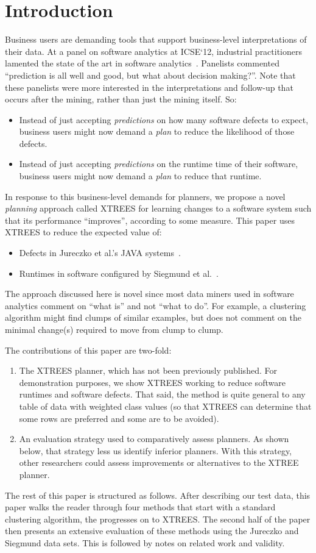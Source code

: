 \documentclass{sig-alternate}
\newcommand{\bi}{\begin{itemize}}
\newcommand{\ei}{\end{itemize}}
\newcommand{\be}{\begin{enumerate}}
\newcommand{\ee}{\end{enumerate}}
\begin{document}
\section{Introduction}
Business users are demanding  tools that support    business-level interpretations of their data. At a panel on software analytics at ICSE`12, industrial practitioners lamented the state of the art in software analytics~\cite{menzies12a}. Panelists commented  ``prediction is all well and good, but what about decision making?''. Note that these panelists were more interested in the interpretations and follow-up that occurs after the mining, rather than just the mining itself. So:
\bi
\item
Instead of just accepting {\em predictions} on how many software defects to expect, business users might now demand a {\em plan} to reduce the likelihood of those defects.
\item
Instead of just accepting {\em predictions} on the runtime time of their software, business users might now demand a {\em plan} to reduce that runtime. 
\ei
In response to this business-level demands for planners,
we propose a novel {\em planning} approach called XTREES for learning changes to a software system
such that its performance ``improves'', according to some measure. This paper uses XTREES
to reduce  the expected value of:
\bi
\item  Defects     in Jureczko et al.'s    JAVA systems~\cite{jureczko10}.
\item Runtimes   in   software    configured by  Siegmund et al.~\cite{sven12}.
\ei 
The approach discussed here is novel since most data miners used in software analytics
comment on ``what is'' and not ``what to do''. For example, a clustering
algorithm might find clumps of similar examples, but does not comment on the minimal
change(s) required to move from clump to clump.

The contributions of this paper are two-fold:
\be
\item
The  XTREES planner, which has not been previously published. For demonstration purposes, we show XTREES
working to reduce software runtimes and software defects. That said, the method is quite general to any table of data with weighted class values (so that XTREES
can determine that some rows are preferred and some are to be avoided).  
\item An evaluation strategy used to comparatively assess planners. As  shown below, that strategy less us identify  inferior planners. With this strategy, other researchers could assess improvements or alternatives to the XTREE planner. 
\ee
The rest of this paper is structured as follows.
After describing our test data,
this paper  walks the reader through four methods that start
with a standard clustering algorithm, the  progresses on to XTREES. The second
half of the paper then presents an extensive evaluation of these methods using 
the Jureczko  and Siegmund data sets. This is followed by notes on related work
and validity.
\end{document}
